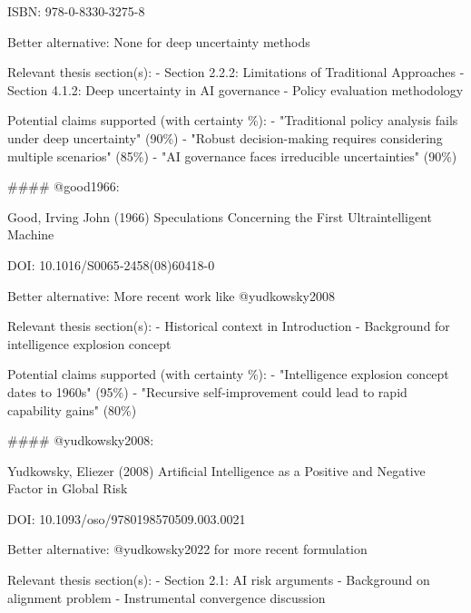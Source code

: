 \documentclass[
  11pt,
  letterpaper,
]{book}
\newenvironment{Shaded}{\begin{snugshade}}{\end{snugshade}}
\newcommand{\FunctionTok}[1]{\textcolor[rgb]{0.28,0.35,0.67}{#1}}
\newcommand{\InformationTok}[1]{\textcolor[rgb]{0.37,0.37,0.37}{#1}}
\begin{document}
\begin{Shaded}
\begin{Highlighting}[]
\InformationTok{    ISBN: 978{-}0{-}8330{-}3275{-}8}

\InformationTok{    Better alternative: None for deep uncertainty methods}

\InformationTok{    Relevant thesis section(s):}
\InformationTok{    {-} Section 2.2.2: Limitations of Traditional Approaches}
\InformationTok{    {-} Section 4.1.2: Deep uncertainty in AI governance}
\InformationTok{    {-} Policy evaluation methodology}

\InformationTok{    Potential claims supported (with certainty \%):}
\InformationTok{    {-} "Traditional policy analysis fails under deep uncertainty" (90\%)}
\InformationTok{    {-} "Robust decision{-}making requires considering multiple scenarios" (85\%)}
\InformationTok{    {-} "AI governance faces irreducible uncertainties" (90\%)}

\FunctionTok{\#\#\#\# \textasciigrave{}@good1966\textasciigrave{}: }

\InformationTok{    Good, Irving John (1966)}
\InformationTok{    Speculations Concerning the First Ultraintelligent Machine}

\InformationTok{    DOI: 10.1016/S0065{-}2458(08)60418{-}0}

\InformationTok{    Better alternative: More recent work like @yudkowsky2008}

\InformationTok{    Relevant thesis section(s):}
\InformationTok{    {-} Historical context in Introduction}
\InformationTok{    {-} Background for intelligence explosion concept}

\InformationTok{    Potential claims supported (with certainty \%):}
\InformationTok{    {-} "Intelligence explosion concept dates to 1960s" (95\%)}
\InformationTok{    {-} "Recursive self{-}improvement could lead to rapid capability gains" (80\%)}

\FunctionTok{\#\#\#\# \textasciigrave{}@yudkowsky2008\textasciigrave{}: }

\InformationTok{    Yudkowsky, Eliezer (2008)}
\InformationTok{    Artificial Intelligence as a Positive and Negative Factor in Global Risk}

\InformationTok{    DOI: 10.1093/oso/9780198570509.003.0021}

\InformationTok{    Better alternative: @yudkowsky2022 for more recent formulation}

\InformationTok{    Relevant thesis section(s):}
\InformationTok{    {-} Section 2.1: AI risk arguments}
\InformationTok{    {-} Background on alignment problem}
\InformationTok{    {-} Instrumental convergence discussion}


\end{Highlighting}
\end{Shaded}
\end{document}
